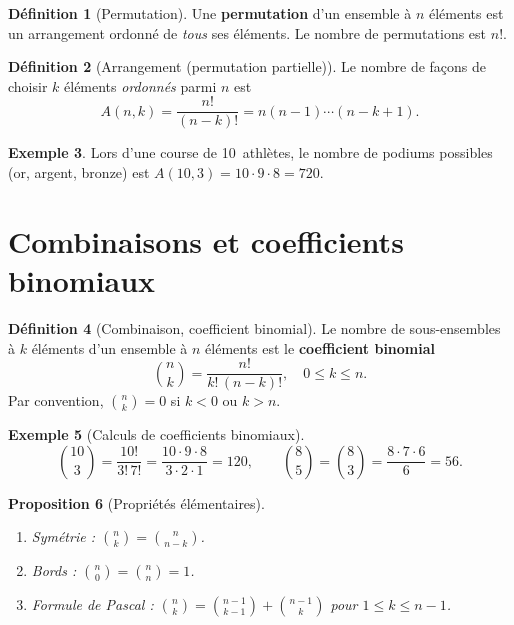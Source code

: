 \documentclass[12pt,a4paper,openany]{book}
\theoremstyle{definition}
\newtheorem{definition}{Définition}[chapter]
\newtheorem{exemple}[definition]{Exemple}
\theoremstyle{plain}
\newtheorem{proposition}[definition]{Proposition}
\theoremstyle{remark}
\begin{document}
\begin{definition}[Permutation]\label{def:permutation}
Une \textbf{permutation} d'un ensemble à $n$ éléments est un arrangement
ordonné de \emph{tous} ses éléments. Le nombre de permutations est $n!$.
\end{definition}

\begin{definition}[Arrangement (permutation partielle)]\label{def:arrangement}
Le nombre de façons de choisir $k$ éléments \emph{ordonnés} parmi $n$ est
\[
  A(n,k) = \frac{n!}{(n-k)!} = n(n-1)\cdots(n-k+1).
\]
\end{definition}

\begin{exemple}\label{ex:podium}
Lors d'une course de 10~athlètes, le nombre de podiums possibles
(or, argent, bronze) est $A(10,3) = 10 \cdot 9 \cdot 8 = 720$.
\end{exemple}

\section{Combinaisons et coefficients binomiaux}\label{sec:combinaisons}

\begin{definition}[Combinaison, coefficient binomial]\label{def:combinaison}
Le nombre de sous-ensembles à $k$ éléments d'un ensemble à $n$ éléments est
le \textbf{coefficient binomial}
\[
  \binom{n}{k} = \frac{n!}{k!\,(n-k)!}, \quad 0 \leq k \leq n.
\]
Par convention, $\binom{n}{k} = 0$ si $k < 0$ ou $k > n$.
\end{definition}

\begin{exemple}[Calculs de coefficients binomiaux]\label{ex:binom-calculs}
\[
  \binom{10}{3} = \frac{10!}{3!\,7!} = \frac{10 \cdot 9 \cdot 8}{3 \cdot 2 \cdot 1} = 120, \qquad
  \binom{8}{5} = \binom{8}{3} = \frac{8 \cdot 7 \cdot 6}{6} = 56.
\]
\end{exemple}

\begin{proposition}[Propriétés élémentaires]\label{prop:binom-elem}
\begin{enumerate}
  \item Symétrie : $\displaystyle\binom{n}{k} = \binom{n}{n-k}$.
  \item Bords : $\displaystyle\binom{n}{0} = \binom{n}{n} = 1$.
  \item Formule de Pascal :
    $\displaystyle\binom{n}{k} = \binom{n-1}{k-1} + \binom{n-1}{k}$
    pour $1 \leq k \leq n-1$.
\end{enumerate}
\end{proposition}
\end{document}
